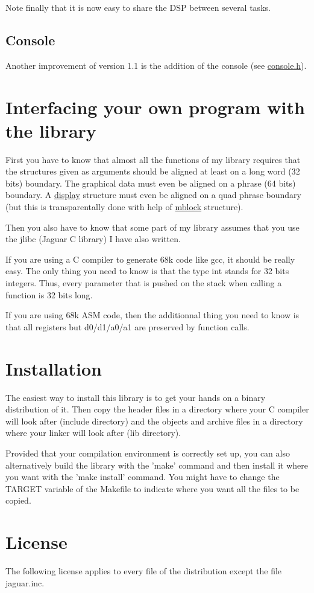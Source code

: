 Note finally that it is now easy to share the DSP between several tasks.\hypertarget{index_console_subsec}{}\subsection{Console}\label{index_console_subsec}
Another improvement of version 1.1 is the addition of the console (see \hyperlink{console_8h}{console.h}).\hypertarget{index_inter_sec}{}\section{Interfacing your own program with the library}\label{index_inter_sec}
First you have to know that almost all the functions of my library requires that the structures given as arguments should be aligned at least on a long word (32 bits) boundary. The graphical data must even be aligned on a phrase (64 bits) boundary. A \hyperlink{structdisplay}{display} structure must even be aligned on a quad phrase boundary (but this is transparentally done with help of \hyperlink{structmblock}{mblock} structure).

Then you also have to know that some part of my library assumes that you use the jlibc (Jaguar C library) I have also written.

If you are using a C compiler to generate 68k code like gcc, it should be really easy. The only thing you need to know is that the type int stands for 32 bits integers. Thus, every parameter that is pushed on the stack when calling a function is 32 bits long.

If you are using 68k ASM code, then the additionnal thing you need to know is that all registers but d0/d1/a0/a1 are preserved by function calls.\hypertarget{index_Installation}{}\section{Installation}\label{index_Installation}
The easiest way to install this library is to get your hands on a binary distribution of it. Then copy the header files in a directory where your C compiler will look after (include directory) and the objects and archive files in a directory where your linker will look after (lib directory).

Provided that your compilation environment is correctly set up, you can also alternatively build the library with the 'make' command and then install it where you want with the 'make install' command. You might have to change the TARGET variable of the Makefile to indicate where you want all the files to be copied.\hypertarget{index_license_sec}{}\section{License}\label{index_license_sec}
The following license applies to every file of the distribution except the file jaguar.inc.

